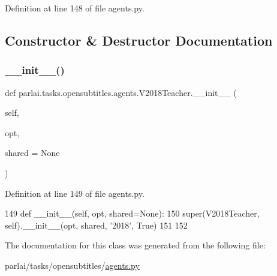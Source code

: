 Definition at line 148 of file agents.\+py.



\subsection{Constructor \& Destructor Documentation}
\mbox{\label{classparlai_1_1tasks_1_1opensubtitles_1_1agents_1_1V2018Teacher_a10803c76b3b6467a673659099d90d777}} 
\subsubsection{\texorpdfstring{\+\_\+\+\_\+init\+\_\+\+\_\+()}{\_\_init\_\_()}}
{\footnotesize\ttfamily def parlai.\+tasks.\+opensubtitles.\+agents.\+V2018\+Teacher.\+\_\+\+\_\+init\+\_\+\+\_\+ (\begin{DoxyParamCaption}\item[{}]{self,  }\item[{}]{opt,  }\item[{}]{shared = {\ttfamily None} }\end{DoxyParamCaption})}



Definition at line 149 of file agents.\+py.


\begin{DoxyCode}
149     \textcolor{keyword}{def }\_\_init\_\_(self, opt, shared=None):
150         super(V2018Teacher, self).\_\_init\_\_(opt, shared, \textcolor{stringliteral}{'2018'}, \textcolor{keyword}{True})
151 
152 
\end{DoxyCode}


The documentation for this class was generated from the following file\+:\begin{DoxyCompactItemize}
\item 
parlai/tasks/opensubtitles/\hyperlink{parlai_2tasks_2opensubtitles_2agents_8py}{agents.\+py}\end{DoxyCompactItemize}
